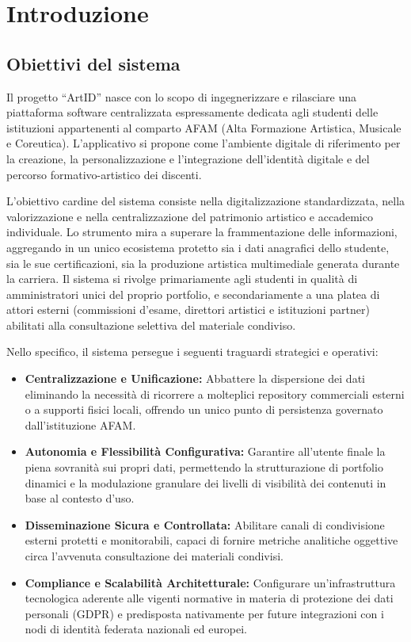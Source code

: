 \section{Introduzione}
\subsection{Obiettivi del sistema}
Il progetto ``ArtID'' nasce con lo scopo di ingegnerizzare e rilasciare una piattaforma software centralizzata espressamente dedicata agli studenti delle istituzioni appartenenti al comparto AFAM (Alta Formazione Artistica, Musicale e Coreutica). L'applicativo si propone come l'ambiente digitale di riferimento per la creazione, la personalizzazione e l'integrazione dell'identità digitale e del percorso formativo-artistico dei discenti.

L'obiettivo cardine del sistema consiste nella digitalizzazione standardizzata, nella valorizzazione e nella centralizzazione del patrimonio artistico e accademico individuale. Lo strumento mira a superare la frammentazione delle informazioni, aggregando in un unico ecosistema protetto sia i dati anagrafici dello studente, sia le sue certificazioni, sia la produzione artistica multimediale generata durante la carriera. Il sistema si rivolge primariamente agli studenti in qualità di amministratori unici del proprio portfolio, e secondariamente a una platea di attori esterni (commissioni d'esame, direttori artistici e istituzioni partner) abilitati alla consultazione selettiva del materiale condiviso. 

Nello specifico, il sistema persegue i seguenti traguardi strategici e operativi:

\begin{itemize}[itemsep=-8pt]
    \item \textbf{Centralizzazione e Unificazione:} Abbattere la dispersione dei dati eliminando la necessità di ricorrere a molteplici repository commerciali esterni o a supporti fisici locali, offrendo un unico punto di persistenza governato dall'istituzione AFAM.
    \item \textbf{Autonomia e Flessibilità Configurativa:} Garantire all'utente finale la piena sovranità sui propri dati, permettendo la strutturazione di portfolio dinamici e la modulazione granulare dei livelli di visibilità dei contenuti in base al contesto d'uso.
    \item \textbf{Disseminazione Sicura e Controllata:} Abilitare canali di condivisione esterni protetti e monitorabili, capaci di fornire metriche analitiche oggettive circa l'avvenuta consultazione dei materiali condivisi.
    \item \textbf{Compliance e Scalabilità Architetturale:} Configurare un'infrastruttura tecnologica aderente alle vigenti normative in materia di protezione dei dati personali (GDPR) e predisposta nativamente per future integrazioni con i nodi di identità federata nazionali ed europei.
\end{itemize}


